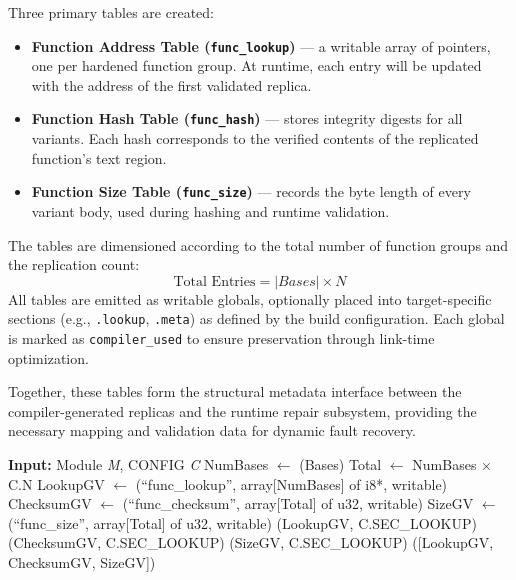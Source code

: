 Three primary tables are created:

\begin{itemize}
  \item \textbf{Function Address Table (\texttt{func\_lookup})} — a writable
  array of pointers, one per hardened function group. At runtime, each entry
  will be updated with the address of the first validated replica.
  \item \textbf{Function Hash Table (\texttt{func\_hash})} — stores integrity
  digests for all variants. Each hash corresponds to the verified contents of
  the replicated function’s text region.
  \item \textbf{Function Size Table (\texttt{func\_size})} — records the byte
  length of every variant body, used during hashing and runtime validation.
\end{itemize}

The tables are dimensioned according to the total number of function groups and
the replication count:
\[
\text{Total Entries} = |Bases| \times N
\]
All tables are emitted as writable globals, optionally placed into target-specific
sections (e.g., \texttt{.lookup}, \texttt{.meta}) as defined by the build
configuration. Each global is marked as \texttt{compiler\_used} to ensure
preservation through link-time optimization.

Together, these tables form the structural metadata interface between the
compiler-generated replicas and the runtime repair subsystem, providing the
necessary mapping and validation data for dynamic fault recovery.

\begin{algorithm}[H]
\caption{Phase E — Emit Global Metadata Structures}
\label{alg:phaseE}
\begin{algorithmic}[1]
\State \textbf{Input:} Module \textit{M}, CONFIG \textit{C}
\State NumBases $\gets$ (Bases)
\State Total $\gets$ NumBases $\times$ C.N
\State LookupGV   $\gets$ (``func\_lookup'',  array[NumBases] of i8*, writable)
\State ChecksumGV $\gets$ (``func\_checksum'', array[Total] of u32, writable)
\State SizeGV     $\gets$ (``func\_size'',     array[Total] of u32, writable)
  \State {}(LookupGV,   C.SEC\_LOOKUP)
  \State {}(ChecksumGV, C.SEC\_LOOKUP)
  \State {}(SizeGV,     C.SEC\_LOOKUP)
\EndIf
\State {}([LookupGV, ChecksumGV, SizeGV])
\end{algorithmic}
\end{algorithm}
\clearpage

